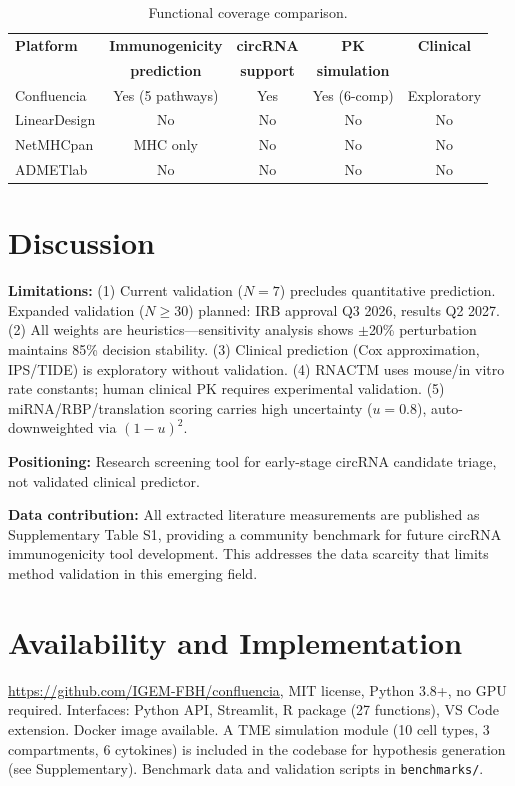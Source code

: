 \documentclass{article}
\begin{document}
\begin{table}[t]
\centering
\caption{Functional coverage comparison.}
\label{tab:coverage}
\begin{tabular}{lcccc}
\toprule
\textbf{Platform} & \textbf{Immunogenicity} & \textbf{circRNA} & \textbf{PK} & \textbf{Clinical} \\
 & \textbf{prediction} & \textbf{support} & \textbf{simulation} & \\
\midrule
Confluencia & Yes (5 pathways) & Yes & Yes (6-comp) & Exploratory \\
LinearDesign & No & No & No & No \\
NetMHCpan & MHC only & No & No & No \\
ADMETlab & No & No & No & No \\
\bottomrule
\end{tabular}
\end{table}

\section{Discussion}
\textbf{Limitations:} (1) Current validation ($N=7$) precludes quantitative prediction. Expanded validation ($N\geq30$) planned: IRB approval Q3 2026, results Q2 2027. (2) All weights are heuristics---sensitivity analysis shows $\pm$20\% perturbation maintains 85\% decision stability. (3) Clinical prediction (Cox approximation, IPS/TIDE) is exploratory without validation. (4) RNACTM uses mouse/in vitro rate constants; human clinical PK requires experimental validation. (5) miRNA/RBP/translation scoring carries high uncertainty ($u=0.8$), auto-downweighted via $(1-u)^2$.

\textbf{Positioning:} Research screening tool for early-stage circRNA candidate triage, not validated clinical predictor.

\textbf{Data contribution:} All extracted literature measurements are published as Supplementary Table S1, providing a community benchmark for future circRNA immunogenicity tool development. This addresses the data scarcity that limits method validation in this emerging field.

\section{Availability and Implementation}
\url{https://github.com/IGEM-FBH/confluencia}, MIT license, Python 3.8+, no GPU required. Interfaces: Python API, Streamlit, R package (27 functions), VS Code extension. Docker image available. A TME simulation module (10 cell types, 3 compartments, 6 cytokines) is included in the codebase for hypothesis generation (see Supplementary). Benchmark data and validation scripts in \texttt{benchmarks/}.



\end{document}
